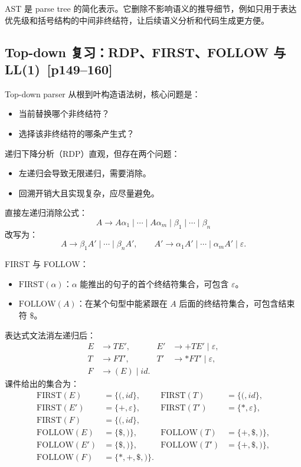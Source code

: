 \documentclass[UTF8,fontset=none,11pt]{ctexart}
\newcommand{\pg}[1]{\texorpdfstring{{\small\color{graytext}\,[p#1]}}{ [p#1]}}
\newcommand{\eps}{\varepsilon}
\newcommand{\FIRST}{\ensuremath{\mathrm{FIRST}}}
\newcommand{\FOLLOW}{\ensuremath{\mathrm{FOLLOW}}}
\begin{document}
AST 是 parse tree 的简化表示。它删除不影响语义的推导细节，例如只用于表达优先级和括号结构的中间非终结符，让后续语义分析和代码生成更方便。

\subsection{Top-down 复习：RDP、FIRST、FOLLOW 与 LL(1) \pg{149--160}}

Top-down parser 从根到叶构造语法树，核心问题是：

\begin{itemize}
  \item 当前替换哪个非终结符？
  \item 选择该非终结符的哪条产生式？
\end{itemize}

递归下降分析（RDP）直观，但存在两个问题：

\begin{itemize}
  \item 左递归会导致无限递归，需要消除。
  \item 回溯开销大且实现复杂，应尽量避免。
\end{itemize}

直接左递归消除公式：
\[
A\to A\alpha_1\mid\cdots\mid A\alpha_m\mid \beta_1\mid\cdots\mid\beta_n
\]
改写为：
\[
A\to \beta_1A'\mid\cdots\mid\beta_nA',\qquad
A'\to \alpha_1A'\mid\cdots\mid\alpha_mA'\mid\eps.
\]

FIRST 与 FOLLOW：

\begin{itemize}
  \item \(\FIRST(\alpha)\)：\(\alpha\) 能推出的句子的首个终结符集合，可包含 \(\eps\)。
  \item \(\FOLLOW(A)\)：在某个句型中能紧跟在 \(A\) 后面的终结符集合，可包含结束符 \(\$\)。
\end{itemize}

表达式文法消左递归后：
\[
\begin{aligned}
E&\to TE', & E'&\to +TE'\mid\eps,\\
T&\to FT', & T'&\to *FT'\mid\eps,\\
F&\to (E)\mid id.
\end{aligned}
\]
课件给出的集合为：
\[
\begin{aligned}
\FIRST(E)&=\{(,id\}, & \FIRST(T)&=\{(,id\},\\
\FIRST(E')&=\{+,\eps\}, & \FIRST(T')&=\{*,\eps\},\\
\FIRST(F)&=\{(,id\},\\
\FOLLOW(E)&=\{\$,)\}, & \FOLLOW(T)&=\{+,\$,)\},\\
\FOLLOW(E')&=\{\$,)\}, & \FOLLOW(T')&=\{+,\$,)\},\\
\FOLLOW(F)&=\{*,+,\$,)\}.
\end{aligned}
\]
\end{document}
